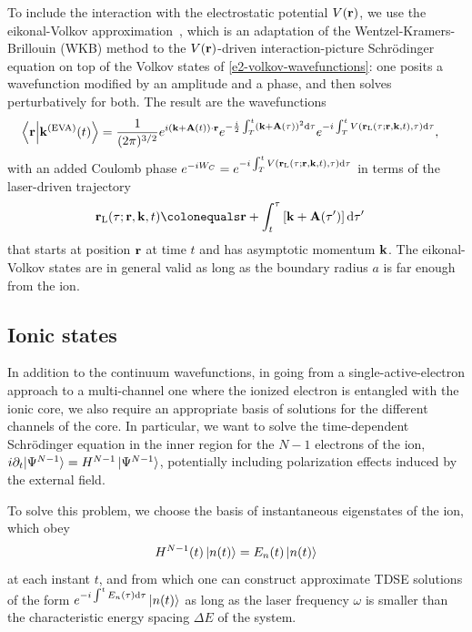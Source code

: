 To include the interaction with the electrostatic potential $V(\vb{r})$, we use the eikonal-Volkov approximation~\cite{eikonalVolkov_initial, eikonalVolkov_prelim}, which is an adaptation of the Wentzel-Kramers-Brillouin (WKB) method to the $V(\vb{r})$-driven interaction-picture Schrödinger equation on top of the Volkov states of \eqref{e2-volkov-wavefunctions}: one posits a wavefunction modified by an amplitude and a phase, and then solves perturbatively for both. The result are the wavefunctions
\begin{align}
\braket{\vb{r}}{\vb{k}^{\mathrm{(EVA)}}(t)}
& = 
\frac{1}{(2\pi)^{3/2}}
e^{i\left(\vb{k}+\vb{A}(t)\right)\cdot\vb{r}} 
e^{-\frac{i}{2} \int_T^t\left(\vb{k}+\vb{A}(\tau)\right)^2\mathrm{d}\tau} 
e^{-i\int_T^t V(\vb{r}_\mathrm{L}(\tau;\vb{r},\vb{k},t),\tau)\mathrm{d}\tau},
\label{e2-eikonal-volkov-wavefunctions}
\end{align}
with an added Coulomb phase $e^{-iW_C}=e^{-i\int_T^t V(\vb{r}_\mathrm{L}(\tau;\vb{r},\vb{k},t),\tau) \mathrm{d}\tau}$ in terms of the laser-driven trajectory
\begin{align}
\rl(\tau;\vb{r},\vb{k},t)
& \colonequals 
\vb{r}+\int_t^\tau \left[\vb{k}+\vba(\tau')\right]\d\tau'
\label{e2-trajectory}
\end{align}
that starts at position $\vb{r}$ at time $t$ and has asymptotic momentum $\vb{k}$. The eikonal-Volkov states are in general valid as long as the boundary radius $a$ is far enough from the ion.






\subsection{Ionic states}
In addition to the continuum wavefunctions, in going from a single-active-electron approach to a multi-channel one where the ionized electron is entangled with the ionic core, we also require an appropriate basis of solutions for the different channels of the core. In particular, we want to solve the time-dependent Schrödinger equation in the inner region for the $N-1$ electrons of the ion, $i\partial_t\!\ket*{\Psi^{N-1}}=H^{N-1}\ket*{\Psi^{N-1}}$, potentially including polarization effects induced by the external field.

To solve this problem, we choose the basis of instantaneous eigenstates of the ion, which obey
\begin{equation}
H^{N-1}(t)\ket{n(t)}=E_n(t)\ket{n(t)}
\label{e2-quasistatic-eigenstates}
\end{equation}
at each instant $t$, and from which one can construct approximate TDSE solutions of the form 
$e^{-i\int^tE_n(\tau)\mathrm{d} \tau}\ket{n(t)}$ as long as the laser frequency $\omega$ is smaller than the characteristic energy spacing $\Delta E$ of the system.

